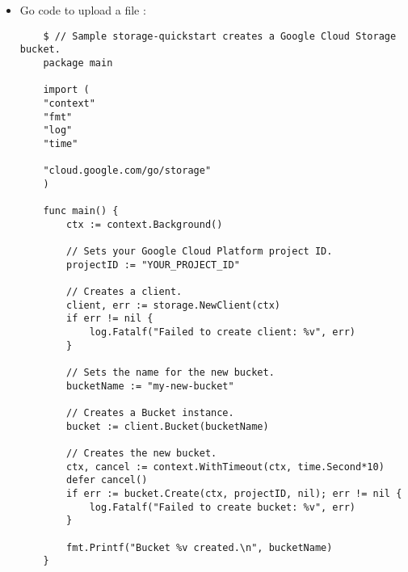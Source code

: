 \begin{itemize}
	\item Go code to upload a file :
	\begin{verbatim}
	$ // Sample storage-quickstart creates a Google Cloud Storage bucket.
	package main
	
	import (
	"context"
	"fmt"
	"log"
	"time"
	
	"cloud.google.com/go/storage"
	)
	
	func main() {
		ctx := context.Background()
		
		// Sets your Google Cloud Platform project ID.
		projectID := "YOUR_PROJECT_ID"
		
		// Creates a client.
		client, err := storage.NewClient(ctx)
		if err != nil {
			log.Fatalf("Failed to create client: %v", err)
		}
		
		// Sets the name for the new bucket.
		bucketName := "my-new-bucket"
		
		// Creates a Bucket instance.
		bucket := client.Bucket(bucketName)
		
		// Creates the new bucket.
		ctx, cancel := context.WithTimeout(ctx, time.Second*10)
		defer cancel()
		if err := bucket.Create(ctx, projectID, nil); err != nil {
			log.Fatalf("Failed to create bucket: %v", err)
		}
		
		fmt.Printf("Bucket %v created.\n", bucketName)
	}
	
	\end{verbatim}
\end{itemize}





